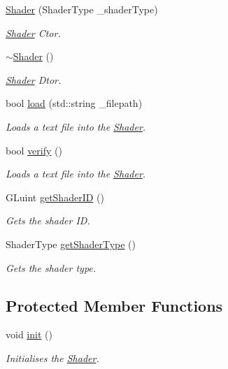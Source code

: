 \begin{DoxyCompactItemize}
\item 
\hyperlink{class_cookie_eng_1_1_graphics_1_1_shader_a98dc593bccbf90a50cadf035b3382374}{Shader} (Shader\+Type \+\_\+shader\+Type)
\begin{DoxyCompactList}\small\item\em \hyperlink{class_cookie_eng_1_1_graphics_1_1_shader}{Shader} Ctor. \end{DoxyCompactList}\item 
\hyperlink{class_cookie_eng_1_1_graphics_1_1_shader_a0c90d1cf0ddfb5f9aef80fd196bbf890}{$\sim$\+Shader} ()
\begin{DoxyCompactList}\small\item\em \hyperlink{class_cookie_eng_1_1_graphics_1_1_shader}{Shader} Dtor. \end{DoxyCompactList}\item 
bool \hyperlink{class_cookie_eng_1_1_graphics_1_1_shader_aa11548ffaa72d77521576044a122af43}{load} (std\+::string \+\_\+filepath)
\begin{DoxyCompactList}\small\item\em Loads a text file into the \hyperlink{class_cookie_eng_1_1_graphics_1_1_shader}{Shader}. \end{DoxyCompactList}\item 
bool \hyperlink{class_cookie_eng_1_1_graphics_1_1_shader_a28abd2dba4a183cb810b196af2e1d5a3}{verify} ()
\begin{DoxyCompactList}\small\item\em Loads a text file into the \hyperlink{class_cookie_eng_1_1_graphics_1_1_shader}{Shader}. \end{DoxyCompactList}\item 
G\+Luint \hyperlink{class_cookie_eng_1_1_graphics_1_1_shader_a4d3333267a9bbdaf9157a59120cf8b51}{get\+Shader\+ID} ()
\begin{DoxyCompactList}\small\item\em Gets the shader ID. \end{DoxyCompactList}\item 
Shader\+Type \hyperlink{class_cookie_eng_1_1_graphics_1_1_shader_adde0294c86137d22a247bd011b8e40c8}{get\+Shader\+Type} ()
\begin{DoxyCompactList}\small\item\em Gets the shader type. \end{DoxyCompactList}\end{DoxyCompactItemize}
\subsection*{Protected Member Functions}
\begin{DoxyCompactItemize}
\item 
void \hyperlink{class_cookie_eng_1_1_graphics_1_1_shader_ae591a7107e04f835f1f8dbc42e0035c6}{init} ()
\begin{DoxyCompactList}\small\item\em Initialises the \hyperlink{class_cookie_eng_1_1_graphics_1_1_shader}{Shader}. \end{DoxyCompactList}\end{DoxyCompactItemize}
